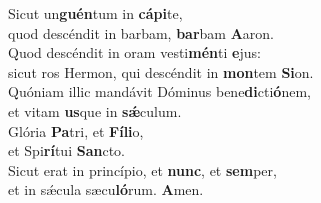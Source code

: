 \evenverse Sicut un\textbf{guén}tum in \textbf{cá}\textbf{pi}te,~\*\\
\evenverse quod descéndit in barbam, \textbf{bar}bam \textbf{A}aron.\\
\oddverse Quod descéndit in oram vesti\textbf{mén}ti \textbf{e}jus:~\*\\
\oddverse sicut ros Hermon, qui descéndit in \textbf{mon}tem \textbf{Si}on.\\
\evenverse Quóniam illic mandávit Dóminus bene\textbf{di}cti\textbf{ó}nem,~\*\\
\evenverse et vitam \textbf{us}que in \textbf{sǽ}culum.\\
\oddverse Glória \textbf{Pa}tri, et \textbf{Fí}\textbf{li}o,~\*\\
\oddverse et Spi\textbf{rí}tui \textbf{San}cto.\\
\evenverse Sicut erat in princípio, et \textbf{nunc}, et \textbf{sem}per,~\*\\
\evenverse et in sǽcula sæcu\textbf{ló}rum. \textbf{A}men.\\
